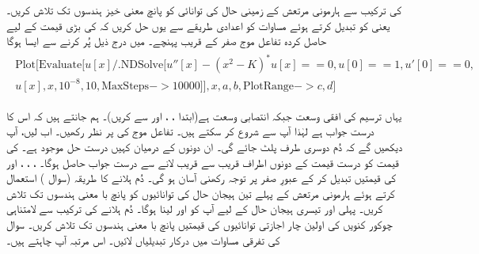  کی ترکیب سے ہارمونی مرتعش کے زمینی حال  کی توانائی کو پانچ معنی خیز ہندسوں تک تلاش کریں۔ یعنی  کو تبدیل کرتے ہوئے مساوات  کو اعدادی طریقے  سے یوں حل کریں کہ  کی بڑی قیمت کے لیے حاصل کردہ  تفاعل موج صفر کے قریب پہنچے۔ میں درج ذیل پُر کرنے سے ایسا ہوگا 
\begin{gather*}
\begin{aligned}
	\text{Plot}[\text{Evaluate}[u[x]/.\text{NDSolve}[{u''[x]-(x^2-K)^*u[x]==0, u[0]==1, u'[0]==0},\\
	u[x],{x, 10^{-8}, 10}, \text{MaxSteps}->\num{10000}]], {x, a, b}, \text{PlotRange}->{c, d}]
\end{aligned}
\end{gather*}


یہاں   ترسیم کی افقی وسعت  جبکہ   انتصابی  وسعت ہے(ابتدا ، ، اور  سے کریں)۔ ہم جانتے ہیں کہ اس کا درست جواب  ہے لہٰذا آپ  سے شروع کر سکتے ہیں۔ تفاعل موج کی  پر نظر رکھیں۔ اب  لیں، آپ دیکھیں گے کہ دُم دوسری طرف پلٹ جائے گی۔ ان دونوں کے  درمیان کہیں درست حل موجود ہے۔  کی قیمت کو درست قیمت کے دونوں اطراف قریب سے قریب لانے سے درست جواب حاصل ہوگا۔  ،  ، ، اور  کی قیمتیں تبدیل کر کے عبورِ صفر  پر توجہ رکھنی  آسان ہو گی۔
دُم ہلانے کا طریقہ (سوال )  استعمال کرتے ہوئے ہارمونی مرتعش کے  پہلے تین ہیجان حال  کی توانائیوں کو پانچ با معنی ہندسوں تک تلاش کریں۔ پہلی اور تیسری ہیجان حال کے لیے آپ کو  اور  لینا ہوگا۔
دُم ہلانے کی ترکیب سے لامتناہی چوکور کنویں کی اولین چار  اجازتی توانائیوں کی قیمتیں پانچ با معنی ہندسوں تک تلاش کریں۔ سوال  کی تفرقی مساوات میں درکار تبدیلیاں لائیں۔ اس مرتبہ  آپ  چاہتے ہیں۔

